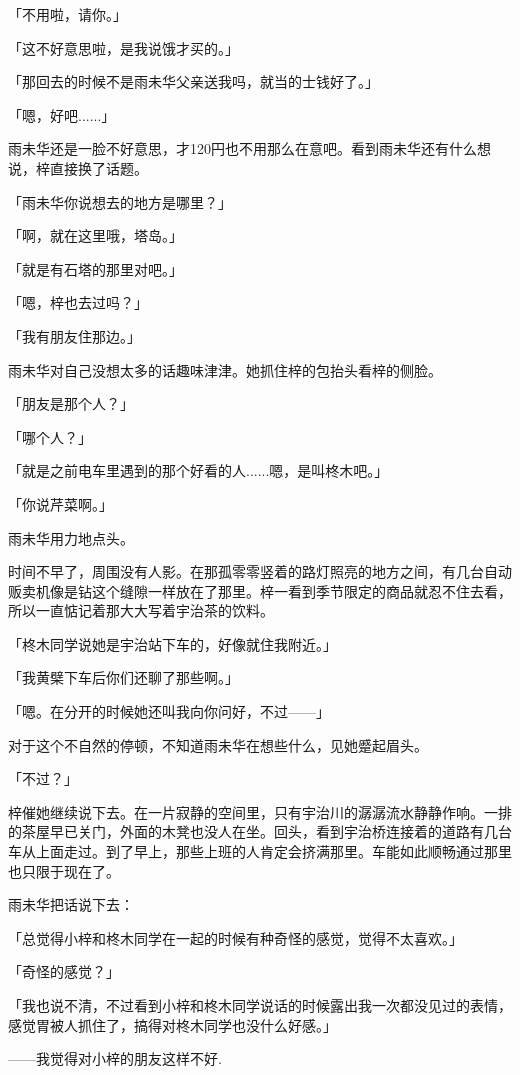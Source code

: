\documentclass[UTF8]{ctexart}
\begin{document}
    「不用啦，请你。」

    「这不好意思啦，是我说饿才买的。」

    「那回去的时候不是雨未华父亲送我吗，就当的士钱好了。」

    「嗯，好吧......」

    雨未华还是一脸不好意思，才120円也不用那么在意吧。看到雨未华还有什么想说，梓直接换了话题。

    「雨未华你说想去的地方是哪里？」

    「啊，就在这里哦，塔岛。」

    「就是有石塔的那里对吧。」

    「嗯，梓也去过吗？」

    「我有朋友住那边。」

    雨未华对自己没想太多的话趣味津津。她抓住梓的包抬头看梓的侧脸。

    「朋友是那个人？」

    「哪个人？」

    「就是之前电车里遇到的那个好看的人......嗯，是叫柊木吧。」

    「你说芹菜啊。」

    雨未华用力地点头。

    时间不早了，周围没有人影。在那孤零零竖着的路灯照亮的地方之间，有几台自动贩卖机像是钻这个缝隙一样放在了那里。梓一看到季节限定的商品就忍不住去看，所以一直惦记着那大大写着宇治茶的饮料。

    「柊木同学说她是宇治站下车的，好像就住我附近。」

    「我黄檗下车后你们还聊了那些啊。」

    「嗯。在分开的时候她还叫我向你问好，不过——」

    对于这个不自然的停顿，不知道雨未华在想些什么，见她蹙起眉头。

    「不过？」

    梓催她继续说下去。在一片寂静的空间里，只有宇治川的潺潺流水静静作响。一排的茶屋早已关门，外面的木凳也没人在坐。回头，看到宇治桥连接着的道路有几台车从上面走过。到了早上，那些上班的人肯定会挤满那里。车能如此顺畅通过那里也只限于现在了。

    雨未华把话说下去：

    「总觉得小梓和柊木同学在一起的时候有种奇怪的感觉，觉得不太喜欢。」

    「奇怪的感觉？」

    「我也说不清，不过看到小梓和柊木同学说话的时候露出我一次都没见过的表情，感觉胃被人抓住了，搞得对柊木同学也没什么好感。」

    ——我觉得对小梓的朋友这样不好.
\end{document}
